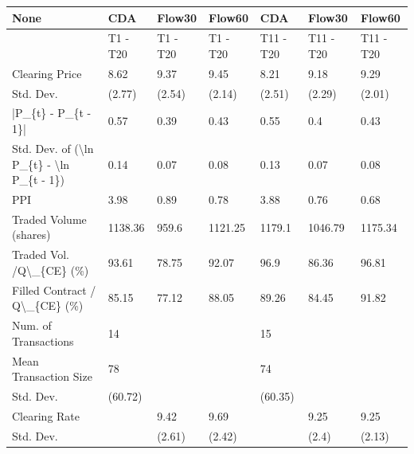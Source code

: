 \begin{tabular}{lllllll}
\hline
 None                                                      & CDA      & Flow30   & Flow60   & CDA       & Flow30    & Flow60    \\
\hline
                                                           & T1 - T20 & T1 - T20 & T1 - T20 & T11 - T20 & T11 - T20 & T11 - T20 \\
 Clearing Price                                            & 8.62     & 9.37     & 9.45     & 8.21      & 9.18      & 9.29      \\
 Std. Dev.                                                 & (2.77)   & (2.54)   & (2.14)   & (2.51)    & (2.29)    & (2.01)    \\
 |P\_\{t\} - P\_\{t - 1\}|                                       & 0.57     & 0.39     & 0.43     & 0.55      & 0.4       & 0.43      \\
 Std. Dev. of (\textbackslash{}ln P\_\{t\} - \textbackslash{}ln P\_\{t - 1\})                  & 0.14     & 0.07     & 0.08     & 0.13      & 0.07      & 0.08      \\
 PPI                                                       & 3.98     & 0.89     & 0.78     & 3.88      & 0.76      & 0.68      \\
 Traded Volume (shares)                                    & 1138.36  & 959.6    & 1121.25  & 1179.1    & 1046.79   & 1175.34   \\
 Traded Vol. /Q\textbackslash{}\_\{CE\} (\%)                                  & 93.61    & 78.75    & 92.07    & 96.9      & 86.36     & 96.81     \\
 Filled Contract / Q\textbackslash{}\_\{CE\} (\%)                             & 85.15    & 77.12    & 88.05    & 89.26     & 84.45     & 91.82     \\
 Num. of Transactions                                      & 14       &          &          & 15        &           &           \\
 Mean Transaction Size                                     & 78       &          &          & 74        &           &           \\
 Std. Dev.                                                 & (60.72)  &          &          & (60.35)   &           &           \\
 Clearing Rate                                             &          & 9.42     & 9.69     &           & 9.25      & 9.25      \\
 Std. Dev.                                                 &          & (2.61)   & (2.42)   &           & (2.4)     & (2.13)    \\

\end{tabular}

